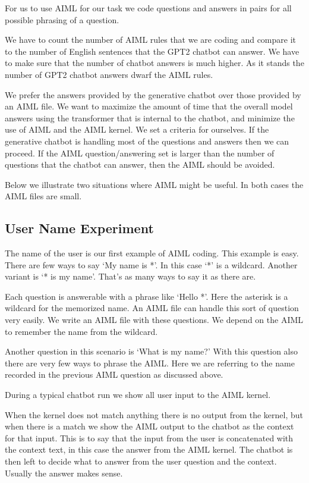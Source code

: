 For us to use AIML for our task we code questions and answers in pairs for all possible phrasing of a question.

We have to count the number of AIML rules that we are coding and compare it to the number of English sentences that the GPT2 chatbot can answer. We have to make sure that the number of chatbot answers is much higher. As it stands the number of GPT2 chatbot answers dwarf the AIML rules.

We prefer the answers provided by the generative chatbot over those provided by an AIML file. We want to maximize the amount of time that the overall model answers using the transformer that is internal to the chatbot, and minimize the use of AIML and the AIML kernel. We set a criteria for ourselves. If the generative chatbot is handling most of the questions and answers then we can proceed. If the AIML question/answering set is larger than the number of questions that the chatbot can answer, then the AIML should be avoided. 

Below we illustrate two situations where AIML might be useful. In both cases the AIML files are small.

\subsection{User Name Experiment}
The name of the user is our first example of AIML coding. This example is easy. There are few ways to say `My name is *'. In this case `*' is a wildcard. Another variant is `* is my name'. That's as many ways to say it as there are.

Each question is answerable with a phrase like `Hello *'. Here the asterisk is a wildcard for the memorized name. An AIML file can handle this sort of question very easily. We write an AIML file with these questions. We depend on the AIML to remember the name from the wildcard. 

Another question in this scenario is `What is my name?' With this question also there are very few ways to phrase the AIML. Here we are referring to the name recorded in the previous AIML question as discussed above. 

During a typical chatbot run we show all user input to the AIML kernel. 

When the kernel does not match anything there is no output from the kernel, but when there is a match we show the AIML output to the chatbot as the context for that input. This is to say that the input from the user is concatenated with the context text, in this case the answer from the AIML kernel. The chatbot is then left to decide what to answer from the user question and the context. Usually the answer makes sense.

